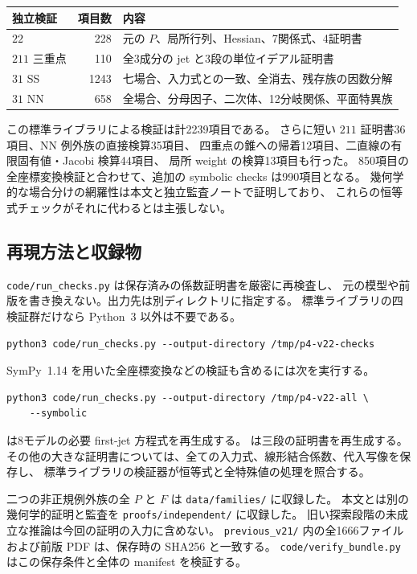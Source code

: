 \begin{center}\small
\begin{tabular}{@{}p{40mm}rp{79mm}@{}}\toprule
独立検証 & 項目数 & 内容\\\midrule
$22$ &228& 元の $P$、局所行列、Hessian、7関係式、4証明書\\
$211$ 三重点 &110& 全3成分の jet と3段の単位イデアル証明書\\
$31$ SS &1243& 七場合、入力式との一致、全消去、残存族の因数分解\\
$31$ NN &658& 全場合、分母因子、二次体、12分岐関係、平面特異族\\\bottomrule
\end{tabular}\end{center}
この標準ライブラリによる検証は計2239項目である。
さらに短い $211$ 証明書36項目、NN 例外族の直接検算35項目、
四重点の錐への帰着12項目、二直線の有限固有値・Jacobi 検算44項目、
局所 weight の検算13項目も行った。
850項目の全座標変換検証と合わせて、追加の symbolic checks は990項目となる。
幾何学的な場合分けの網羅性は本文と独立監査ノートで証明しており、
これらの恒等式チェックがそれに代わるとは主張しない。

\subsection{再現方法と収録物}
\texttt{code/run\_checks.py} は保存済みの係数証明書を厳密に再検査し、
元の模型や前版を書き換えない。出力先は別ディレクトリに指定する。
標準ライブラリの四検証群だけなら Python~3 以外は不要である。
\begin{verbatim}
python3 code/run_checks.py --output-directory /tmp/p4-v22-checks
\end{verbatim}
SymPy~1.14 を用いた全座標変換などの検証も含めるには次を実行する。
\begin{verbatim}
python3 code/run_checks.py --output-directory /tmp/p4-v22-all \
    --symbolic
\end{verbatim}
 は8モデルの必要 first-jet 方程式を再生成する。
 は三段の証明書を再生成する。
その他の大きな証明書については、全ての入力式、線形結合係数、代入写像を保存し、
標準ライブラリの検証器が恒等式と全特殊値の処理を照合する。

二つの非正規例外族の全 $P$ と $F$ は \texttt{data/families/} に収録した。
本文とは別の幾何学的証明と監査を \texttt{proofs/independent/} に収録した。
旧い探索段階の未成立な推論は今回の証明の入力に含めない。
\texttt{previous\_v21/} 内の全1666ファイルおよび前版 PDF は、保存時の SHA256 と一致する。
\texttt{code/verify\_bundle.py} はこの保存条件と全体の manifest を検証する。

